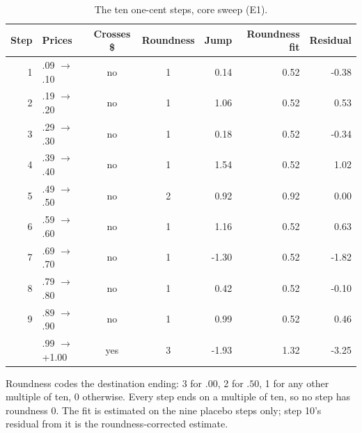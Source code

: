 \begin{table}[t]
\centering
\caption{The ten one-cent steps, core sweep (E1).}
\label{tab:steps}
\small
\begin{tabular}{rlccrrr}
\toprule
Step & Prices & Crosses \$ & Roundness & Jump & Roundness fit & Residual \\
\midrule
1 & .09 $\to$ .10 & no & 1 & 0.14 & 0.52 & -0.38 \\
2 & .19 $\to$ .20 & no & 1 & 1.06 & 0.52 & 0.53 \\
3 & .29 $\to$ .30 & no & 1 & 0.18 & 0.52 & -0.34 \\
4 & .39 $\to$ .40 & no & 1 & 1.54 & 0.52 & 1.02 \\
5 & .49 $\to$ .50 & no & 2 & 0.92 & 0.92 & 0.00 \\
6 & .59 $\to$ .60 & no & 1 & 1.16 & 0.52 & 0.63 \\
7 & .69 $\to$ .70 & no & 1 & -1.30 & 0.52 & -1.82 \\
8 & .79 $\to$ .80 & no & 1 & 0.42 & 0.52 & -0.10 \\
9 & .89 $\to$ .90 & no & 1 & 0.99 & 0.52 & 0.46 \\
\addlinespace 10 & .99 $\to$ +1.00 & yes & 3 & -1.93 & 1.32 & -3.25 \\
\bottomrule
\end{tabular}
\vspace{2pt}
\parbox{\linewidth}{\footnotesize Roundness codes the destination ending: 3 for $.00$, 2 for $.50$, 1 for any other multiple of ten, 0 otherwise. Every step ends on a multiple of ten, so no step has roundness 0. The fit is estimated on the nine placebo steps only; step 10's residual from it is the roundness-corrected estimate.}
\end{table}
